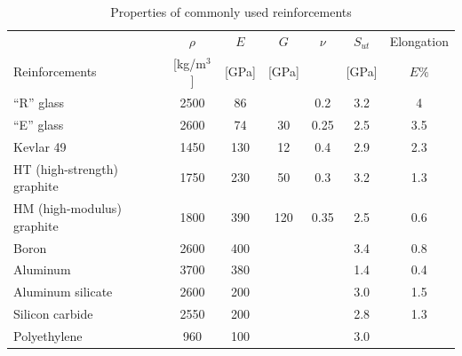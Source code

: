 \documentclass[
10pt,
a4paper,
openany,
svgnames,
]{book}
\begin{document}
\begin{table}[H]
  \centering
  \caption{Properties of commonly used reinforcements \cite{gay2014composite}}
  \begin{tabular}{lcccccc}
    \toprule
                   & $\rho$         & $E$ & $G$       & $\nu$ & $S_{ut}$  & Elongation \\
    Reinforcements & [kg/m$^3$] & [GPa] & [GPa] &       & [GPa] & $E\%$ \\
    \midrule
    ``R'' glass                 & 2500 & 86  &     & 0.2  & 3.2 & 4 \\
    ``E'' glass                 & 2600 & 74  & 30  & 0.25 & 2.5 & 3.5 \\
    Kevlar 49                   & 1450 & 130 & 12  & 0.4  & 2.9 & 2.3 \\
    HT (high-strength) graphite & 1750 & 230 & 50  & 0.3  & 3.2 & 1.3 \\
    HM (high-modulus) graphite  & 1800 & 390 & 120 & 0.35 & 2.5 & 0.6 \\
    Boron                       & 2600 & 400 &     &      & 3.4 & 0.8 \\
    Aluminum                    & 3700 & 380 &     &      & 1.4 & 0.4 \\
    Aluminum silicate           & 2600 & 200 &     &      & 3.0 & 1.5 \\
    Silicon carbide             & 2550 & 200 &     &      & 2.8 & 1.3 \\
    Polyethylene                & 960  & 100 &     &      & 3.0 & \\
    \bottomrule
  \end{tabular}
  \label{tab: reinforcement props}
\end{table}
\nocite{*}

\backmatter

\printbibliography[heading=bibintoc]
\end{document}

